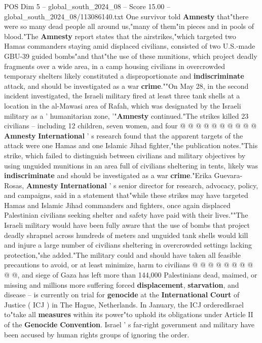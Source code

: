 \begin{textsample}{POS Dim 5 – global\_south\_2024\_08 – Score 15.00 – global\_south\_2024\_08/113086140.txt}
One survivor told \textbf{Amnesty} that"there were so many dead people all around us,"many of them"in pieces and in pools of blood."The \textbf{Amnesty} report states that the airstrikes,"which targeted two Hamas commanders staying amid displaced civilians, consisted of two U.S.-made GBU-39 guided bombs"and that"the use of these munitions, which project deadly fragments over a wide area, in a camp housing civilians in overcrowded temporary shelters likely constituted a disproportionate and \textbf{indiscriminate} attack, and should be investigated as a war \textbf{crime}.""On May 28, in the second incident investigated, the Israeli military fired at least three tank shells at a location in the al-Mawasi area of Rafah, which was designated by the Israeli military as a ' humanitarian zone, '"\textbf{Amnesty} continued."The strikes killed 23 civilians -- including 12 children, seven women, and four @ @ @ @ @ @ @ @ @ @ \textbf{Amnesty} \textbf{International} ' s research found that the apparent targets of the attack were one Hamas and one Islamic Jihad fighter,"the publication notes."This strike, which failed to distinguish between civilians and military objectives by using unguided munitions in an area full of civilians sheltering in tents, likely was \textbf{indiscriminate} and should be investigated as a war \textbf{crime}."Erika Guevara-Rosas, \textbf{Amnesty} \textbf{International} ' s senior director for research, advocacy, policy, and campaigns, said in a statement that"while these strikes may have targeted Hamas and Islamic Jihad commanders and fighters, once again displaced Palestinian civilians seeking shelter and safety have paid with their lives.""The Israeli military would have been fully aware that the use of bombs that project deadly shrapnel across hundreds of meters and unguided tank shells would kill and injure a large number of civilians sheltering in overcrowded settings lacking protection,"she added."The military could and should have taken all feasible precautions to avoid, or at least minimize, harm to civilians @ @ @ @ @ @ @ @ @ @, and siege of Gaza has left more than 144,000 Palestinians dead, maimed, or missing and millions more suffering forced \textbf{displacement}, \textbf{starvation}, and disease -- is currently on trial for \textbf{genocide} at the \textbf{International} \textbf{Court} of Justice ( ICJ ) in The Hague, Netherlands.
In January, the ICJ orderedIsrael to"take all \textbf{measures} within its power"to uphold its obligations under Article II of the \textbf{Genocide} \textbf{Convention}.
Israel ' s far-right government and military have been accused by human rights groups of ignoring the order.

\end{textsample}
